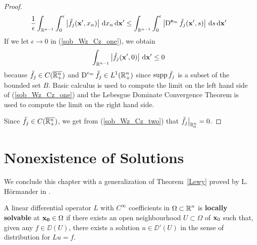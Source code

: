 \begin{proof}
\begin{equation} \label{sob_Wz_Cz_one}
\frac{1}{\epsilon} \int_{\mathbb{R}^{n-1}} \int_0^\epsilon
\left| \tilde{f}_j(\mathbf{x}', x_n) \right| \,\mathrm{d}{x_n} \,\mathrm{d}{\mathbf{x}'}
\leq \int_{\mathbb{R}^{n-1}} \int_0^\epsilon
\left| \operatorname{D}^{\mathbf{e}_m}\tilde{f}_j(\mathbf{x}',s) \right| \,\mathrm{d}{s} \,\mathrm{d}{\mathbf{x}'}
\end{equation}
If we let $\epsilon \rightarrow 0$ in (\ref{sob_Wz_Cz_one}),
we obtain 
\begin{equation} \label{sob_Wz_Cz_two}
\int_{\mathbb{R}^{n-1}} \left| \tilde{f}_j(\mathbf{x}', 0) \right| \,\mathrm{d}{\mathbf{x}'}
\leq 0
\end{equation}
because $\displaystyle \tilde{f}_j \in C(\overline{\mathbb{R}^n_+})$ and
$\displaystyle \operatorname{D}^{e_m}\tilde{f}_j \in L^1(\mathbb{R}^n_+)$ since
$\operatorname{supp} \tilde{f}_j$ is a subset of the bounded set $B$.  Basic
calculus is used to compute the limit on the left hand side of 
(\ref{sob_Wz_Cz_one}) and the Lebesgue Dominate Convergence Theorem
is used to compute the limit on the right hand side.

Since $\tilde{f}_j \in C(\overline{\mathbb{R}^n_+})$, we get from
(\ref{sob_Wz_Cz_two}) that $\displaystyle \tilde{f}_j\big|_{\mathbb{R}^n_0} = 0$.
\end{proof}

\section{Nonexistence of Solutions}

We conclude this chapter with a generalization of Theorem~\ref{Lewy}
proved by L. Hörmander in \cite{Horm}.

\begin{defn}
A linear differential operator $L$ with $\displaystyle C^\infty$ coefficients in
$\displaystyle \Omega \subset \mathbb{R}^n$ is
{\bfseries locally solvable} at 
$\mathbf{x_0} \in \Omega$ if there exists an open neighbourhood
$U \subset \Omega$ of $\mathbf{x}_0$ such that, given any
$f\in \DD(U)$, there exists a solution $u \in \DD'(U)$ in the sense of
distribution for $Lu = f$.
\end{defn}

